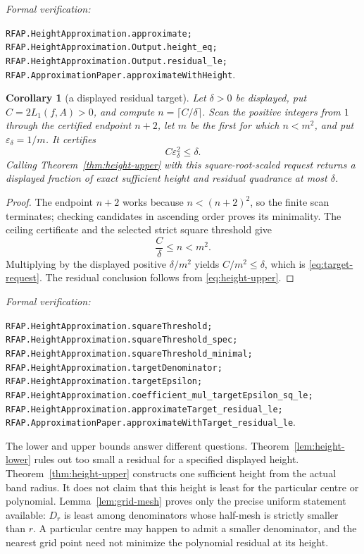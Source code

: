 \documentclass[11pt]{article}
\newtheorem{corollary}[corollary]{Corollary}
\newcommand{\eps}{\varepsilon}
\newcommand{\leanref}[1]{\par\smallskip\noindent
  \emph{Formal verification:}\par\nobreak
  {\raggedright\nolinkurl{#1}.\par}}
\begin{document}
\leanref{RFAP.HeightApproximation.approximate;
RFAP.HeightApproximation.Output.height_eq;
RFAP.HeightApproximation.Output.residual_le;
RFAP.ApproximationPaper.approximateWithHeight}

\begin{corollary}[a displayed residual target]
\label{cor:height-target}
Let $\delta>0$ be displayed, put $C=2L_1(f,A)>0$, and compute
$n=\lceil C/\delta\rceil$.  Scan the positive integers from $1$ through the
certified endpoint $n+2$, let $m$ be the first for which $n<m^2$, and put
$\eps_\delta=1/m$.
It certifies
\begin{equation}
\label{eq:target-request}
                         C\eps_\delta^2\le\delta.
\end{equation}
Calling Theorem~\ref{thm:height-upper} with this square-root-scaled request
returns a displayed fraction of exact sufficient height and residual
quadrance at most $\delta$.
\end{corollary}

\begin{proof}
The endpoint $n+2$ works because $n<(n+2)^2$, so the finite scan terminates;
checking candidates in ascending order proves its minimality.  The ceiling
certificate and the selected strict square threshold give
\[
                    \frac C\delta\le n<m^2.
\]
Multiplying by the displayed positive $\delta/m^2$ yields
$C/m^2\le\delta$, which is \eqref{eq:target-request}.  The residual
conclusion follows from \eqref{eq:height-upper}.
\end{proof}

\leanref{RFAP.HeightApproximation.squareThreshold;
RFAP.HeightApproximation.squareThreshold_spec;
RFAP.HeightApproximation.squareThreshold_minimal;
RFAP.HeightApproximation.targetDenominator;
RFAP.HeightApproximation.targetEpsilon;
RFAP.HeightApproximation.coefficient_mul_targetEpsilon_sq_le;
RFAP.HeightApproximation.approximateTarget_residual_le;
RFAP.ApproximationPaper.approximateWithTarget_residual_le}

The lower and upper bounds answer different questions.  Theorem~\ref{lem:height-lower}
rules out too small a residual for a specified displayed height.  Theorem~\ref{thm:height-upper}
constructs one sufficient height from the actual band radius.  It does not
claim that this height is least for the particular centre or polynomial.
Lemma~\ref{lem:grid-mesh} proves only the precise uniform statement available:
$D_r$ is least among denominators whose half-mesh is strictly smaller than
$r$.  A particular centre may happen to admit a smaller denominator, and
the nearest grid point need not minimize the polynomial residual at its
height.
\end{document}
